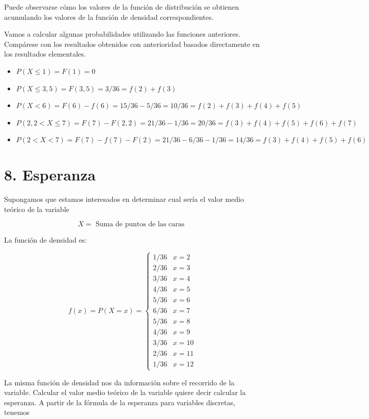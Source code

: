 \documentclass[
  a4paper,
  DIV=11,
  numbers=noendperiod]{scrreprt}
\providecommand{\tightlist}{%
  \setlength{\itemsep}{0pt}\setlength{\parskip}{0pt}}\usepackage{longtable,booktabs,array}
\begin{document}
Puede observarse cómo los valores de la función de distribución se
obtienen acumulando los valores de la función de densidad
correspondientes.

Vamos a calcular algunas probabilidades utilizando las funciones
anteriores. Compárese con los resultados obtenidos con anterioridad
basados directamente en los resultados elementales.

\begin{itemize}
\tightlist
\item
  \(P(X \leq 1)=F(1)=0\)
\item
  \(P(X \leq 3,5)=F(3,5)=3 / 36=f(2)+f(3)\)
\item
  \(P(X<6)=F(6)-f(6)=15 / 36-5 / 36=10 / 36=f(2)+f(3)+f(4)+f(5)\)
\item
  \(P(2,2<X \leq 7)=F(7)-F(2,2)=21 / 36-1 / 36=20 / 36=f(3)+f(4)+f(5)+f(6)+f(7)\)
\item
  \(P(2<X<7)=F(7)-f(7)-F(2)=21 / 36-6 / 36-1 / 36=14 / 36=f(3)+f(4)+f(5)+f(6)\)
\end{itemize}

\section{8. Esperanza}\label{esperanza}

Supongamos que estamos interesados en determinar cual sería el valor
medio teórico de la variable

\[
X=\text { Suma de puntos de las caras }
\]

La función de densidad es:

\[
f(x)=P(X=x)= \begin{cases}1 / 36 & x=2 \\ 2 / 36 & x=3 \\ 3 / 36 & x=4 \\ 4 / 36 & x=5 \\ 5 / 36 & x=6 \\ 6 / 36 & x=7 \\ 5 / 36 & x=8 \\ 4 / 36 & x=9 \\ 3 / 36 & x=10 \\ 2 / 36 & x=11 \\ 1 / 36 & x=12\end{cases}
\]

La misma función de densidad nos da información sobre el recorrido de la
variable. Calcular el valor medio teórico de la variable quiere decir
calcular la esperanza. A partir de la fórmula de la esperanza para
variables discretas, tenemos
\end{document}
